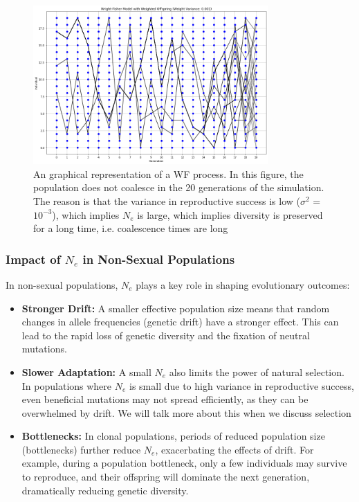 \documentclass[10pt,a4paper]{scrbook}
\begin{document}
\begin{figure}[htbp]
    \centering
    \includegraphics[width=0.8\textwidth]{WF3.png}  %
    \caption{An graphical representation of a WF process. In this figure, the population does not coalesce in the 20 generations of the simulation. The reason is that the variance in reproductive success is low (\(\sigma^2\) = $10^{-3}$), which implies $N_e$ is large, which implies diversity is preserved for a long time, i.e. coalescence times are long}
    \label{fig:WF1}
\end{figure}

\subsubsection{Impact of \(N_e\) in Non-Sexual Populations}

In non-sexual populations, \(N_e\) plays a key role in shaping evolutionary outcomes:

\begin{itemize}
    \item \textbf{Stronger Drift:} A smaller effective population size means that random changes in allele frequencies (genetic drift) have a stronger effect. This can lead to the rapid loss of genetic diversity and the fixation of neutral mutations.
    
    \item \textbf{Slower Adaptation:} A small \(N_e\) also limits the power of natural selection. In populations where \(N_e\) is small due to high variance in reproductive success, even beneficial mutations may not spread efficiently, as they can be overwhelmed by drift. We will talk more about this when we discuss selection
    
    \item \textbf{Bottlenecks:} In clonal populations, periods of reduced population size (bottlenecks) further reduce \(N_e\), exacerbating the effects of drift. For example, during a population bottleneck, only a few individuals may survive to reproduce, and their offspring will dominate the next generation, dramatically reducing genetic diversity.
\end{itemize}
\end{document}
